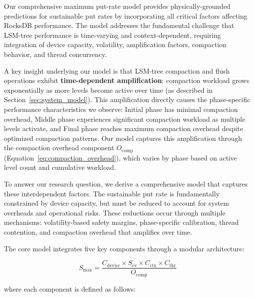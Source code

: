 \documentclass[11pt]{article}
\begin{document}
Our comprehensive maximum put-rate model provides physically-grounded predictions for sustainable put rates by incorporating all critical factors affecting RocksDB performance. The model addresses the fundamental challenge that LSM-tree performance is time-varying and context-dependent, requiring integration of device capacity, volatility, amplification factors, compaction behavior, and thread concurrency.

A key insight underlying our model is that LSM-tree compaction and flush operations exhibit \textbf{time-dependent amplification}: compaction workload grows exponentially as more levels become active over time (as described in Section~\ref{sec:system_model}). This amplification directly causes the phase-specific performance characteristics we observe: Initial phase has minimal compaction overhead, Middle phase experiences significant compaction workload as multiple levels activate, and Final phase reaches maximum compaction overhead despite optimized compaction patterns. Our model captures this amplification through the compaction overhead component $O_{\text{comp}}$ (Equation~\ref{eq:compaction_overhead}), which varies by phase based on active level count and cumulative workload.

To answer our research question, we derive a comprehensive model that captures these interdependent factors. The sustainable put rate is fundamentally constrained by device capacity, but must be reduced to account for system overheads and operational risks. These reductions occur through multiple mechanisms: volatility-based safety margins, phase-specific calibration, thread contention, and compaction overhead that amplifies over time.

The core model integrates five key components through a modular architecture:

\begin{equation}
S_{\max} = \frac{C_{\text{device}} \times S_{\text{cv}} \times C_{\text{ctx}} \times C_{\text{thr}}}{O_{\text{comp}}}
\label{eq:comprehensive_smax}
\end{equation}

where each component is defined as follows:
\end{document}
